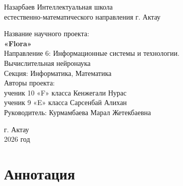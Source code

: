 \documentclass[12pt,a4paper]{article}
\begin{document}
\thispagestyle{empty}

\begin{center}
{\large Назарбаев Интеллектуальная школа\\
естественно-математического направления г. Актау}\\[0.3cm]

\vspace{2.2cm}

{\normalsize Название научного проекта:}\\[0.2cm]
{\Large\bfseries «Flora»}\\[1.4cm]

{\normalsize
Направление 6: Информационные системы и технологии.\\
Вычислительная нейронаука}\\[0.3cm]
{\normalsize Секция: Информатика, Математика}\\[1.0cm]

{\normalsize Авторы проекта:}\\[0.1cm]
{\normalsize ученик 10 «F» класса Кенжегали Нурас}\\
{\normalsize ученик 9 «E» класса Сарсенбай Алихан}\\[1.0cm]

{\normalsize Руководитель: Курмамбаева Марал Жетекбаевна}\\[0.1cm]

\vspace{2.6cm}

{\normalsize г. Актау}\\
{\normalsize 2026 год}
\end{center}

\newpage

\tableofcontents
\newpage

\section*{Аннотация}
\end{document}
